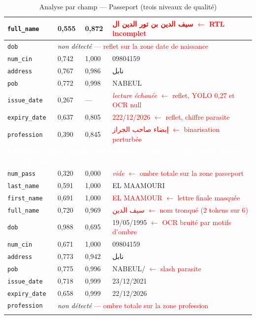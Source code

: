\begin{longtable}{|p{3cm}|p{1.8cm}|p{1.8cm}|p{7.5cm}|}
  \texttt{full\_name}   & 0,555 & 0,872 & \textcolor{red}{\textarabic{سيف الدين بن تور الدين ال}} \textcolor{red}{\small$\leftarrow$ RTL incomplet} \\ \hline
  \texttt{dob}          & \multicolumn{3}{p{11.1cm}|}{\textit{non détecté} \textcolor{red}{\small--- reflet sur la zone date de naissance}} \\ \hline
  \texttt{num\_cin}     & 0,742 & 1,000 & 09804159 \\ \hline
  \texttt{address}      & 0,767 & 0,986 & \textarabic{نابل} \\ \hline
  \texttt{pob}          & 0,772 & 0,998 & NABEUL \\ \hline
  \texttt{issue\_date}  & 0,267 & --- & \textcolor{red}{\textit{lecture échouée}} \textcolor{red}{\small$\leftarrow$ reflet, YOLO 0,27 et OCR null} \\ \hline
  \texttt{expiry\_date} & 0,637 & 0,805 & \textcolor{red}{222/12/2026} \textcolor{red}{\small$\leftarrow$ reflet, chiffre parasite} \\ \hline
  \texttt{profession}   & 0,390 & 0,845 & \textcolor{red}{\textarabic{إبضاء صاحب الجراز}} \textcolor{red}{\small$\leftarrow$ binarisation perturbée} \\ \hline
  \multicolumn{4}{|p{14.2cm}|}{\cellcolor{bleu_principal}\textcolor{white}{\textbf{Passeport ombre soleil (conf. globale : 0,860) --- ombre motif couvre toute l'image}}} \\ \hline
  \texttt{num\_pass}    & 0,320 & 0,000 & \textcolor{red}{\textit{vide}} \textcolor{red}{\small$\leftarrow$ ombre totale sur la zone passeport} \\ \hline
  \texttt{last\_name}   & 0,591 & 1,000 & EL MAAMOURI \\ \hline
  \texttt{first\_name}  & 0,691 & 1,000 & \textcolor{red}{EL MAAMOUR} \textcolor{red}{\small$\leftarrow$ lettre finale masquée} \\ \hline
  \texttt{full\_name}   & 0,720 & 0,969 & \textcolor{red}{\textarabic{سيف الدين}} \textcolor{red}{\small$\leftarrow$ nom tronqué (2 tokens sur 6)} \\ \hline
  \texttt{dob}          & 0,988 & 0,695 & 19/05/1995 \textcolor{red}{\small$\leftarrow$ OCR bruité par motifs d'ombre} \\ \hline
  \texttt{num\_cin}     & 0,671 & 1,000 & 09804159 \\ \hline
  \texttt{address}      & 0,773 & 0,942 & \textarabic{نابل} \\ \hline
  \texttt{pob}          & 0,775 & 0,996 & NABEUL/ \textcolor{red}{\small$\leftarrow$ slash parasite} \\ \hline
  \texttt{issue\_date}  & 0,718 & 0,999 & 23/12/2021 \\ \hline
  \texttt{expiry\_date} & 0,658 & 0,999 & 22/12/2026 \\ \hline
  \texttt{profession}   & \multicolumn{3}{p{11.1cm}|}{\textit{non détecté} \textcolor{red}{\small--- ombre totale sur la zone profession}} \\ \hline
  \caption{Analyse par champ --- Passeport (trois niveaux de qualité)}
  \label{tab:analyse-passeport}
\end{longtable}

